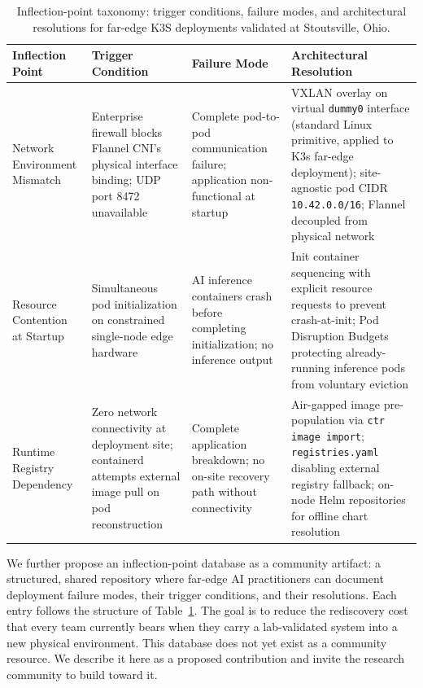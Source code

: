\begin{table}[htbp]
\centering
\small
\caption{Inflection-point taxonomy: trigger conditions, failure modes, and architectural resolutions for far-edge K3S deployments validated at Stoutsville, Ohio.}
\label{tab:inflection_taxonomy}
\begin{tabularx}{\textwidth}{|X|X|X|X|}
\hline
\textbf{Inflection Point} & \textbf{Trigger Condition} & \textbf{Failure Mode} & \textbf{Architectural Resolution} \\
\hline

Network Environment Mismatch
& Enterprise firewall blocks Flannel CNI's physical interface binding; UDP port 8472 unavailable
& Complete pod-to-pod communication failure; application non-functional at startup
& VXLAN overlay on virtual \texttt{dummy0} interface (standard Linux primitive, applied to K3s far-edge deployment); site-agnostic pod CIDR \texttt{10.42.0.0/16}; Flannel decoupled from physical network \\
\hline

Resource Contention at Startup
& Simultaneous pod initialization on constrained single-node edge hardware
& AI inference containers crash before completing initialization; no inference output
& Init container sequencing with explicit resource requests to prevent crash-at-init; Pod Disruption Budgets protecting already-running inference pods from voluntary eviction \\
\hline

Runtime Registry Dependency
& Zero network connectivity at deployment site; containerd attempts external image pull on pod reconstruction
& Complete application breakdown; no on-site recovery path without connectivity
& Air-gapped image pre-population via \texttt{ctr image import}; \texttt{registries.yaml} disabling external registry fallback; on-node Helm repositories for offline chart resolution \\
\hline

\end{tabularx}
\end{table}

We further propose an inflection-point database as a community artifact: a structured, shared repository where far-edge AI practitioners can document deployment failure modes, their trigger conditions, and their resolutions. Each entry follows the structure of Table~\ref{tab:inflection_taxonomy}. The goal is to reduce the rediscovery cost that every team currently bears when they carry a lab-validated system into a new physical environment. This database does not yet exist as a community resource. We describe it here as a proposed contribution and invite the research community to build toward it.

